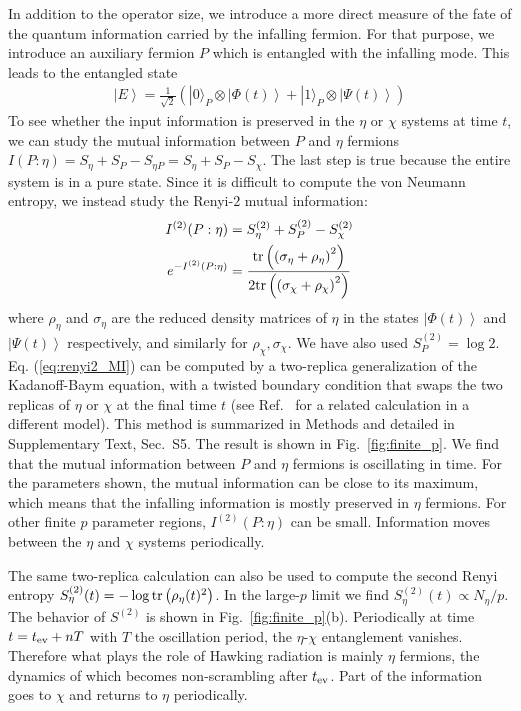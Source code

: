 \documentclass[pdflatex,sn-nature]{sn-jnl}
\begin{document}
In addition to the operator size, we introduce a more direct measure of the fate of the quantum information carried by the infalling fermion. For that purpose, we introduce an auxiliary fermion $P$ which is entangled with the infalling mode. This leads to the entangled state
\begin{align}
	\left|E\right\rangle=\frac1{\sqrt{2}}\left(|0\rangle_P\otimes \left|\Phi(t)\right\rangle+|1\rangle_P\otimes\left|\Psi(t)\right\rangle\right)
\end{align}
To see whether the input information is preserved in the $\eta$ or $\chi$ systems at time $t$, we can study the mutual information between $P$ and $\eta$ fermions $I(P:\eta)=S_\eta+S_P-S_{\eta P}=S_\eta+S_P-S_\chi$. The last step is true because the entire system is in a pure state. Since it is difficult to compute the von Neumann entropy, we instead study the Renyi-$2$ mutual information:
\begin{align}
		I^{(2)}(P:\eta)&=S_\eta^{(2)}+S_P^{(2)}-S_\chi^{(2)}\\
		e^{-I^{(2)}(P:\eta)}&=\frac{{\rm tr}\left(\left(\sigma_\eta+\rho_\eta\right)^2\right)}{2{\rm tr}\left(\left(\sigma_\chi+\rho_\chi\right)^2\right)}\label{eq:renyi2_MI}
\end{align}
where $\rho_\eta$ and $\sigma_\eta$ are the reduced density matrices of $\eta$ in the states $\left|\Phi(t)\right\rangle$ and $\left|\Psi(t)\right\rangle$ respectively, and similarly for $\rho_\chi,\sigma_\chi$. We have also used $S_P^{(2)}=\log 2$. Eq. (\ref{eq:renyi2_MI}) can be computed by a two-replica generalization of the Kadanoff-Baym equation, with a twisted boundary condition that swaps the two replicas of $\eta$ or $\chi$ at the final time $t$ (see Ref.~\cite{chen2020replica} for a related calculation in a different model). This method is summarized in Methods and detailed in Supplementary Text, Sec.~S5. The result is shown in Fig.~\ref{fig:finite_p}. We find that the mutual information between $P$ and $\eta$ fermions is oscillating in time. For the parameters shown, the mutual information can be close to its maximum, which means that the infalling information is mostly preserved in $\eta$ fermions. For other finite \(p\) parameter regions, \(I^{(2)}(P:\eta)\) can be small. Information moves between the $\eta$ and $\chi$ systems periodically.

The same two-replica calculation can also be used to compute the second Renyi entropy $S^{(2)}_\eta(t)=-\log{\rm tr}\left(\rho_\eta(t)^2\right)$. In the large-$p$ limit we find $S^{(2)}_\eta(t)\propto N_\eta/p$. The behavior of $S^{(2)}$ is shown in Fig.~\ref{fig:finite_p}(b). Periodically at time $t=t_{\rm ev}+nT$ with $T$ the oscillation period, the $\eta$-$\chi$ entanglement vanishes. Therefore what plays the role of Hawking radiation is mainly $\eta$ fermions, the dynamics of which becomes non-scrambling after $t_{\rm ev}$.
Part of the information goes to $\chi$ and returns to $\eta$ periodically.
\end{document}
